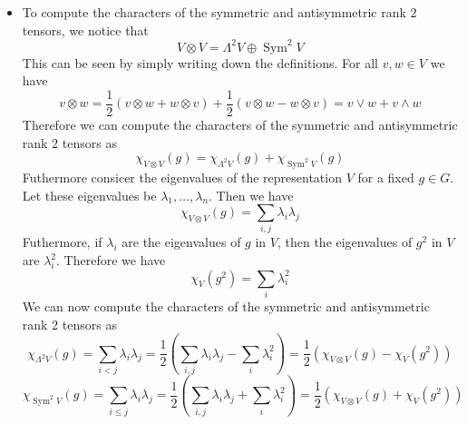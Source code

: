 \documentclass[a4paper,11pt,oneside]{article}
\begin{document}
{\begin{itemize}
            \item To compute the characters of the symmetric and antisymmetric rank 2 tensors, we notice that
            \[V \otimes V = \Lambda^2 V \oplus \operatorname{Sym}^2 V\]
            This can be seen by simply writing down the definitions. For all \(v,w \in V\) we have
            \[ v \otimes w = \frac12 (v \otimes w + w \otimes v) + \frac12 (v \otimes w - w \otimes v) = v \vee w + v \wedge w\]
            Therefore we can compute the characters of the symmetric and antisymmetric rank 2 tensors as
            \[\chi_{V \otimes V}(g) = \chi_{\Lambda^2 V}(g) + \chi_{\operatorname{Sym}^2 V}(g)\]
            Futhermore consicer the eigenvalues of the representation \(V\) for a fixed \(g \in G\). Let these eigenvalues be \(\lambda_1, \ldots, \lambda_n\). Then we have
            \[\chi_{V \otimes V}(g) = \sum_{i,j} \lambda_i \lambda_j \]
            Futhermore, if \(\lambda_i\) are the eigenvalues of \(g\) in \(V\), then the eigenvalues of \(g^2\) in \(V\) are \(\lambda_i^2\). Therefore we have
            \[\chi_V(g^2) = \sum_i \lambda_i^2\]
            We can now compute the characters of the symmetric and antisymmetric rank 2 tensors as
            \[\chi_{\Lambda^2 V}(g) = \sum_{i<j} \lambda_i \lambda_j = \frac12 \left( \sum_{i,j} \lambda_i \lambda_j - \sum_i \lambda_i^2 \right) = \frac12 (\chi_{V \otimes V}(g) - \chi_V(g^2))\]
            \[\chi_{\operatorname{Sym}^2 V}(g) = \sum_{i \leq j} \lambda_i \lambda_j = \frac12 \left(\sum_{i,j} \lambda_i \lambda_j + \sum_i \lambda_i^2 \right) = \frac12 (\chi_{V \otimes V}(g) + \chi_V(g^2))\]
        \end{itemize}
    }
\end{document}
